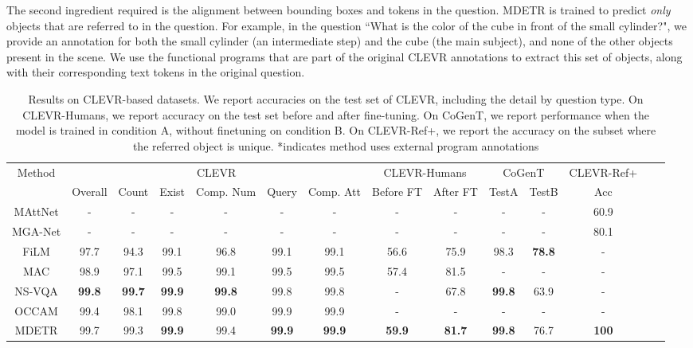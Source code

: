 The second ingredient required is the alignment between bounding boxes and tokens in the question. MDETR is trained to predict \textit{only} objects that are referred to in the question. For example, in the question ``What is the color of the cube in front of the small cylinder?", we provide an annotation for both the small cylinder (an intermediate step) and the cube (the main subject), and none of the other objects present in the scene. We use the functional programs that are part of the original CLEVR annotations to extract this set of objects, along with their corresponding text tokens in the original question.

\setlength{\tabcolsep}{4pt}
\begin{table*}[t]
\begin{center}
\small
 \begin{tabular}{cccccccccccccc} 
 \toprule
Method & \multicolumn{6}{c}{CLEVR} & \multicolumn{2}{c}{CLEVR-Humans} & \multicolumn{2}{c}{CoGenT} &CLEVR-Ref+ \\ [0.5ex]
        & Overall & Count & Exist & Comp. Num & Query     & Comp. Att   & Before FT & After FT & TestA & TestB& Acc  \\
 \midrule 
 MAttNet\cite{yu_mattnet_2018}&-&-&-&-&-&-&-&-&-&-&60.9\\
 MGA-Net\cite{Zheng_2020_ACCV}&-&-&-&-&-&-&-&-&-&-&80.1\\
 FiLM\cite{perezFiLMVisualReasoning2017} &97.7&94.3&99.1&96.8&99.1&99.1 &56.6 & 75.9 & 98.3 & \textbf{78.8}&-\\

 MAC \cite{Hudson2018CompositionalAN}   & 98.9    & 97.1 & 99.5  & 99.1 & 99.5 & 99.5 & 57.4 & 81.5 & - & - &-\\
 NS-VQA\cite{yiNeuralSymbolicVQADisentangling2019} & \textbf{99.8} & \textbf{99.7} & \textbf{99.9} & \textbf{99.8} & 99.8 & 99.8 & -&67.8&\textbf{99.8} & 63.9 &-\\
 OCCAM \cite{wangInterpretableVisualReasoning2020} & 99.4 & 98.1 & 99.8 & 99.0 & 99.9 & 99.9 & - & - & - & - &- \\
 MDETR & 99.7 & 99.3 & \textbf{99.9} & 99.4 & \textbf{99.9} & \textbf{99.9} & \textbf{59.9} & \textbf{81.7} & \textbf{99.8} & 76.7 &\textbf{100}\\
\bottomrule
\end{tabular}
\caption{Results on CLEVR-based datasets. We report accuracies on the test set of CLEVR, including the detail by question type. On CLEVR-Humans, we report accuracy on the test set before and after fine-tuning. On CoGenT, we report performance when the model is trained in condition A, without finetuning on condition B. On CLEVR-Ref+, we report the accuracy on the subset where the referred object is unique. *indicates method uses external program annotations}
\label{tab:clevrresults}
\end{center}
\end{table*}




